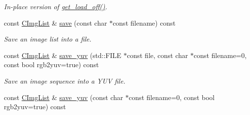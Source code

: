 \begin{DoxyCompactItemize}
\begin{DoxyCompactList}\small\item\em In-\/place version of \hyperlink{structcimg__library_1_1_c_img_list_ae7b63a914d821432d97b0986231c3246}{get\_\-load\_\-off()}. \item\end{DoxyCompactList}\item 
const \hyperlink{structcimg__library_1_1_c_img_list}{CImgList} \& \hyperlink{structcimg__library_1_1_c_img_list_a452e4505123dab2b8e4619dfd89dd851}{save} (const char $\ast$const filename) const 
\begin{DoxyCompactList}\small\item\em Save an image list into a file. \item\end{DoxyCompactList}\item 
\hypertarget{structcimg__library_1_1_c_img_list_aede555bb2df9d7128286e7605f806e43}{
const \hyperlink{structcimg__library_1_1_c_img_list}{CImgList} \& \hyperlink{structcimg__library_1_1_c_img_list_aede555bb2df9d7128286e7605f806e43}{save\_\-yuv} (std::FILE $\ast$const file, const char $\ast$const filename=0, const bool rgb2yuv=true) const }
\label{structcimg__library_1_1_c_img_list_aede555bb2df9d7128286e7605f806e43}

\begin{DoxyCompactList}\small\item\em Save an image sequence into a YUV file. \item\end{DoxyCompactList}\item 
\hypertarget{structcimg__library_1_1_c_img_list_a4d22cc80edc4692865409efc38ac406d}{
const \hyperlink{structcimg__library_1_1_c_img_list}{CImgList} \& \hyperlink{structcimg__library_1_1_c_img_list_a4d22cc80edc4692865409efc38ac406d}{save\_\-yuv} (const char $\ast$const filename=0, const bool rgb2yuv=true) const }
\label{structcimg__library_1_1_c_img_list_a4d22cc80edc4692865409efc38ac406d}


\end{DoxyCompactItemize}

